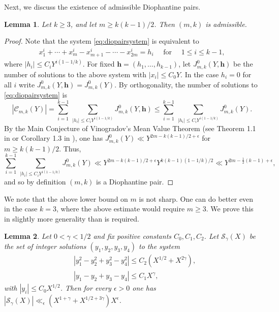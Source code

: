 \documentclass[11pt,reqno]{amsart}
\newtheorem{lemma}{Lemma}[section]
\numberwithin{equation}{section}
\begin{document}
Next, we discuss the existence of admissible Diophantine pairs. 
\begin{lemma} \label{lem:vinodiopair}
Let $k \geq 3$, and let $m \geq k(k-1)/2$. Then $(m,k)$ is admissible. 
\end{lemma}

\begin{proof} Note that the system \eqref{eq:diopairsystem} is equivalent to 
\begin{align*} 
x_1^{i}+\cdots+x_{m}^i - x_{m+1}^i-\cdots-x_{2m}^i = h_i \quad \text{ for } \quad 1 \leq i \leq k-1,
\end{align*}
where $|h_i| \leq C_iY^{i(1-1/k)}$. For fixed $\mathbf{h}=(h_1,\ldots,h_{k-1})$, let $J^0_{m,k}(Y,\mathbf{h})$ be the number of solutions to the above system with $|x_i| \leq C_0Y$. In the case $h_i = 0$ for all $i$ write $J^0_{m,k}(Y,\mathbf{h}) = J^0_{m,k}(Y)$. By orthogonality, the number of solutions to \eqref{eq:diopairsystem} is 
\[ |\mathcal{C}_{m,k}(Y)| =  \sum_{i=1}^{k-1} \, \sum_{|h_i| \leq C_iY^{i(1-1/k)}} J^0_{m,k}(Y,\mathbf{h}) \leq \sum_{i=1}^{k-1} \, \sum_{|h_i| \leq C_iY^{i(1-1/k)}} J^0_{m,k}(Y). \]
By the Main Conjecture of Vinogradov's Mean Value Theorem (see Theorem 1.1 in \cite{BDG} or Corollary 1.3 in \cite{WooNEC}), one has $J^0_{m,k}(Y) \ll Y^{2m -k(k-1)/2+\epsilon}$ for $m \geq k(k-1)/2$. Thus, 
\[ \sum_{i=1}^{k-1} \, \sum_{|h_i| \leq C_iY^{i(1-1/k)}} J^0_{m,k}(Y) \ll Y^{2m-k(k-1)/2+\epsilon}Y^{k(k-1)(1-1/k) /2} \ll Y^{2m-\frac{1}{2}(k-1)+\epsilon}, \]
and so by definition $(m,k)$ is a Diophantine pair. 
\end{proof}

We note that the above lower bound on $m$ is not sharp. One can do better even in the case $k = 3$, where the above estimate would require $m \geq 3$. We prove this in slightly more generality than is required. 
\begin{lemma} \label{lem:conj2}
Let $0 < \gamma < 1/2$ and fix positive constants $C_0, C_1, C_2$. Let $\mathcal{S}_{\gamma}(X)$ be the set of integer solutions $(y_1,y_2,y_3,y_4)$ to the system 
\begin{align*} 
& |y_1^2-y_2^2+y_3^2-y_4^2| \leq C_2 (X^{1/2}+X^{2\gamma}),
\\
& |y_1-y_2+y_3-y_4| \leq C_1X^{\gamma}, 
\end{align*}
with $|y_i| \leq C_0X^{1/2}$. Then for every $\epsilon > 0$ one has $|\mathcal{S}_{\gamma}(X)| \ll_{\epsilon} (X^{1+\gamma}+X^{1/2+3\gamma}) X^{\epsilon}$. 
\end{lemma}
\end{document}
